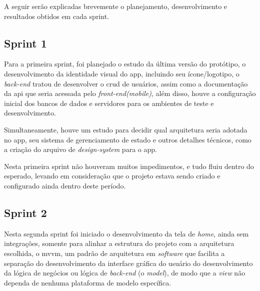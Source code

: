 A seguir serão explicadas brevemente o planejamento, desenvolvimento e resultados obtidos em cada sprint.

\subsection{Sprint 1}\label{ssec:sprint1}

Para a primeira sprint, foi planejado o estudo da última versão do protótipo, o desenvolvimento da identidade visual do \ac{app}, incluindo seu ícone/logotipo, o \textit{back-end} tratou de desenvolver o \ac{crud} de usuários, assim como a documentação da \ac{api} que seria acessada pelo \textit{front-end(mobile)}, além disso, houve a configuração inicial dos bancos de dados e servidores para os ambientes de teste e desenvolvimento.

Simultaneamente, houve um estudo para decidir qual arquitetura seria adotada no \ac{app}, seu sistema de gerenciamento de estado e outros detalhes técnicos, como a criação do arquivo de \textit{design-system} para o \ac{app}. 

Nesta primeira sprint não houveram muitos impedimentos, e tudo fluiu dentro do esperado, levando em consideração que o projeto estava sendo criado e configurado ainda dentro deste período.

\subsection{Sprint 2}\label{ssec:sprint2}
Nesta segunda sprint foi iniciado o desenvolvimento da tela de \textit{home}, ainda sem integrações, somente para alinhar a estrutura do projeto com a arquitetura escolhida, o \ac{mvvm}, um padrão de arquitetura em \textit{software} que facilita a separação do desenvolvimento da interface gráfica do usuário do desenvolvimento da lógica de negócios ou lógica de \textit{back-end} (o \textit{model}), de modo que a \textit{view} não dependa de nenhuma plataforma de modelo específica.

